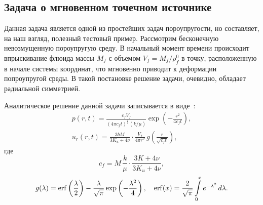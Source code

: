 \newpage

\subsection{Задача о мгновенном точечном источнике}

Данная задача является одной из простейших задач пороупругости, но составляет, на наш взгляд, полезный тестовый пример.
Рассмотрим бесконечную невозмущенную пороупругую среду.
В начальный момент времени происходит впрыскивание флюида массы $M_f$ с объемом $V_f = M_f/\rho^0_f$ в точку,
расположенную в начале системы координат, что мгновенно приводит к деформации попроупругой среды.
В такой постановке решение задачи, очевидно, обладает радиальной симметрией.


Аналитическое решение данной задачи записывается в виде~\cite{coussy_2004}:
%
\begin{gather}
\label{eq:prdot}
p(r,t) = %
\frac{c_f V_f}{(4\pi c_f t)^{\frac32}(k/\mu)}\exp\left(-\frac{r^2}{4c_ft} \right),\\
%
\label{eq:urdot}
u_r(r,t) = \frac{3 b M}{3K_u + 4 \nu} \cdot \frac{V_f}{4\pi r^2} \,g\left(\frac r{\sqrt{c_f t}}\right),
\end{gather}
где
\begin{equation}
\label{eq:cf}
c_f = M \,\frac{k}{\mu} \cdot \frac{3K + 4\nu}{3K_u + 4\nu},
\end{equation}
%
\begin{equation*}
g(\lambda) = {\rm erf}\left(\frac\lambda2\right) - \frac\lambda{\sqrt\pi}\exp\left(-\frac{\lambda^2}4\right), \quad
{\rm erf}(x) = \frac 2{\sqrt \pi} \int\limits_0^x e^{-\lambda^2}\,d\lambda.
\end{equation*}


